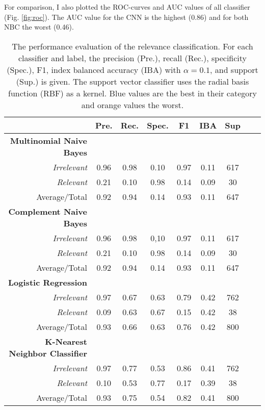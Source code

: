   For comparison, I also plotted the ROC-curves and AUC values of all classifier (Fig. \ref{fig:roc}). The AUC value for the CNN is the highest (0.86) and for both NBC the worst (0.46).

  \begin{table}[h!]
    \caption{The performance evaluation of the relevance classification. For each classifier and label, the precision (Pre.), recall (Rec.), specificity (Spec.), F1, index balanced accuracy (IBA) with $\alpha = 0.1$, and support (Sup.) is given. The support vector classifier uses the radial basis function (RBF) as a kernel. Blue values are the best in their category and orange values the worst.}
    \centering
    \begin{tabular}{@{}rcccccccc@{}}
      \toprule
       & \textbf{Pre.} & \textbf{Rec.} & \textbf{Spec.}
      & \textbf{F1} &  \textbf{IBA}& \textbf{Sup} \\
      \midrule
      \textbf{Multinomial Naive Bayes}\\
      \textsl{Irrelevant}& 0.96& 0.98&  0.10& 0.97& 0.11& 617 \\
      \textsl{Relevant}& 0.21& 0.10&  0.98& 0.14& 0.09& 30 \\
      Average/Total& 0.92& 0.94& 0.14& 0.93& 0.11& 647 \vspace{2mm}\\
      \textbf{Complement Naive Bayes}\\
      \textsl{Irrelevant}& 0.96& 0.98&  0,10& 0.97& 0.11& 617 \\
      \textsl{Relevant}& 0.21& 0.10&  0.98& 0.14& 0.09& 30 \\
      Average/Total& 0.92& 0.94& 0.14& 0.93& 0.11& 647 \vspace{2mm}\\
      \textbf{Logistic Regression}\\
      \textsl{Irrelevant}& 0.97& 0.67&  0.63& 0.79& 0.42& 762 \\
      \textsl{Relevant}& 0.09& 0.63&  0.67& 0.15& 0.42& 38 \\
      Average/Total& 0.93& 0.66& 0.63& 0.76& 0.42& 800 \vspace{2mm}\\
      \textbf{K-Nearest Neighbor Classifier}\\
      \textsl{Irrelevant}& 0.97& 0.77&  0.53& 0.86& 0.41& 762 \\
      \textsl{Relevant}& 0.10& 0.53&  0.77& 0.17& 0.39& 38 \\
      Average/Total& 0.93& 0.75& 0.54& 0.82& 0.41& 800 \vspace{2mm}\\

\end{tabular}
\end{table}
